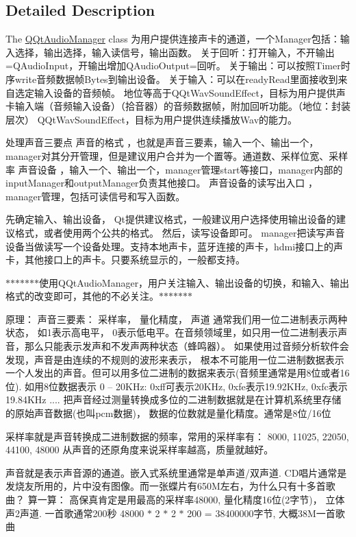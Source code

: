 \subsection{Detailed Description}
The \mbox{\hyperlink{class_q_qt_audio_manager}{Q\+Qt\+Audio\+Manager}} class 为用户提供连接声卡的通道，一个\+Manager包括：输入选择，输出选择，输入读信号，输出函数。 关于回听：打开输入，不开输出=Q\+Audio\+Input，开输出增加\+Q\+Audio\+Output=回听。 关于输出：可以按照\+Timer时序write音频数据帧\+Bytes到输出设备。 关于输入：可以在ready\+Read里面接收到来自选定输入设备的音频帧。 地位等高于\+Q\+Qt\+Wav\+Sound\+Effect，目标为用户提供声卡输入端（音频输入设备）（拾音器）的音频数据帧，附加回听功能。（地位：封装层次） Q\+Qt\+Wav\+Sound\+Effect，目标为用户提供连续播放\+Wav的能力。 

处理声音三要点 声音的格式 ，也就是声音三要素，输入一个、输出一个，manager对其分开管理，但是建议用户合并为一个置等。通道数、采样位宽、采样率 声音设备 ，输入一个、输出一个，manager管理start等接口，manager内部的input\+Manager和output\+Manager负责其他接口。 声音设备的读写出入口 ，manager管理，包括可读信号和写入函数。

先确定输入、输出设备， Qt提供建议格式，一般建议用户选择使用输出设备的建议格式，或者使用两个公共的格式。 然后，读写设备即可。 manager把读写声音设备当做读写一个设备处理。支持本地声卡，蓝牙连接的声卡，hdmi接口上的声卡，其他接口上的声卡。只要系统显示的，一般都支持。

$\ast$$\ast$$\ast$$\ast$$\ast$$\ast$$\ast$使用\+Q\+Qt\+Audio\+Manager，用户关注输入、输出设备的切换，和输入、输出格式的改变即可，其他的不必关注。$\ast$$\ast$$\ast$$\ast$$\ast$$\ast$$\ast$

原理： 声音三要素： 采样率， 量化精度， 声道 通常我们用一位二进制表示两种状态， 如1表示高电平， 0表示低电平。在音频领域里，如只用一位二进制表示声音，那么只能表示发声和不发声两种状态（蜂鸣器）。 如果使用过音频分析软件会发现，声音是由连续的不规则的波形来表示， 根本不可能用一位二进制数据表示一个人发出的声音。但可以用多位二进制的数据来表示(音频里通常是用8位或者16位). 如用8位数据表示 0 -- 20\+K\+Hz\+: 0xff可表示20\+K\+Hz, 0xfe表示19.92\+K\+Hz, 0xfc表示19.84\+K\+Hz .... 把声音经过测量转换成多位的二进制数据就是在计算机系统里存储的原始声音数据(也叫pcm数据)， 数据的位数就是量化精度。通常是8位/16位

采样率就是声音转换成二进制数据的频率，常用的采样率有： 8000, 11025, 22050, 44100, 48000 从声音的还原角度来说采样率越高，质量就越好。

声音就是表示声音源的通道。嵌入式系统里通常是单声道/双声道. C\+D唱片通常是发烧友所用的，片中没有图像。而一张蝶片有650\+M左右，为什么只有十多首歌曲？ 算一算： 高保真肯定是用最高的采样率48000, 量化精度16位(2字节)， 立体声2声道. 一首歌通常200秒 48000 $\ast$ 2 $\ast$ 2 $\ast$ 200 = 38400000字节, 大概38\+M一首歌曲

